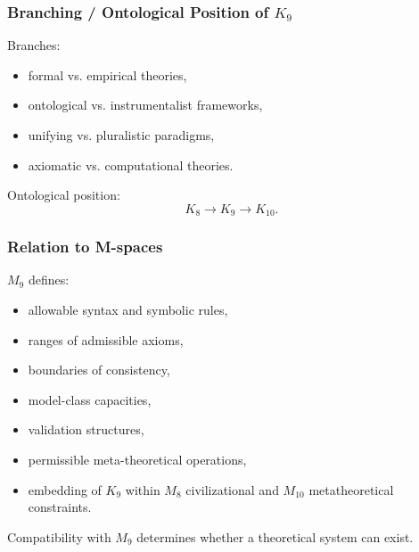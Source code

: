 \subsubsection{Branching / Ontological Position of \texorpdfstring{$K_9$}{K_9}}

Branches:
\begin{itemize}
    \item formal vs. empirical theories,
    \item ontological vs. instrumentalist frameworks,
    \item unifying vs. pluralistic paradigms,
    \item axiomatic vs. computational theories.
\end{itemize}

Ontological position:
\[
K_8 \to K_9 \to K_{10}.
\]

\subsubsection{Relation to M-spaces}

$M_9$ defines:
\begin{itemize}
    \item allowable syntax and symbolic rules,
    \item ranges of admissible axioms,
    \item boundaries of consistency,
    \item model-class capacities,
    \item validation structures,
    \item permissible meta-theoretical operations,
    \item embedding of $K_9$ within $M_8$ civilizational and $M_{10}$ metatheoretical constraints.
\end{itemize}

Compatibility with $M_9$ determines whether a theoretical system can exist.
